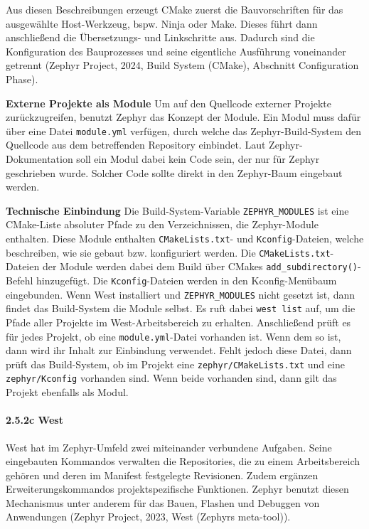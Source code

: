 Aus diesen Beschreibungen erzeugt CMake zuerst die Bauvorschriften f{\"u}r das ausgew{\"a}hlte Host-Werkzeug, bspw. Ninja oder Make. Dieses f{\"u}hrt dann anschlie{\ss}end die {\"U}bersetzungs- und Linkschritte aus. Dadurch sind die Konfiguration des Bauprozesses und seine eigentliche Ausf{\"u}hrung voneinander getrennt (Zephyr Project, 2024, \glqq{}Build System (CMake)\grqq{}, Abschnitt \glqq{}Configuration Phase\grqq{}).

\textbf{Externe Projekte als Module} Um auf den Quellcode externer Projekte zur{\"u}ckzugreifen, benutzt Zephyr das Konzept der \glqq{}Module\grqq{}. Ein Modul muss daf{\"u}r {\"u}ber eine Datei \lstinline[style=fileinline]|module.yml| verf{\"u}gen, durch welche das Zephyr-Build-System den Quellcode aus dem betreffenden Repository einbindet. Laut Zephyr-Dokumentation soll ein Modul dabei kein Code sein, der nur f{\"u}r Zephyr geschrieben wurde. Solcher Code sollte direkt in den Zephyr-Baum eingebaut werden.

\textbf{Technische Einbindung} Die Build-System-Variable \lstinline[style=fileinline]|ZEPHYR_MODULES| ist eine CMake-Liste absoluter Pfade zu den Verzeichnissen, die Zephyr-Module enthalten. Diese Module enthalten \lstinline[style=fileinline]|CMakeLists.txt|- und \lstinline[style=fileinline]|Kconfig|-Dateien, welche beschreiben, wie sie gebaut bzw. konfiguriert werden. Die \lstinline[style=fileinline]|CMakeLists.txt|-Dateien der Module werden dabei dem Build {\"u}ber CMakes \lstinline[style=fileinline]|add_subdirectory()|-Befehl hinzugef{\"u}gt. Die \lstinline[style=fileinline]|Kconfig|-Dateien werden in den Kconfig-Men{\"u}baum eingebunden. Wenn West installiert und \lstinline[style=fileinline]|ZEPHYR_MODULES| nicht gesetzt ist, dann findet das Build-System die Module selbst. Es ruft dabei \lstinline[style=fileinline]|west list| auf, um die Pfade aller Projekte im West-Arbeitsbereich zu erhalten. Anschlie{\ss}end pr{\"u}ft es f{\"u}r jedes Projekt, ob eine \lstinline[style=fileinline]|module.yml|-Datei vorhanden ist. Wenn dem so ist, dann wird ihr Inhalt zur Einbindung verwendet. Fehlt jedoch diese Datei, dann pr{\"u}ft das Build-System, ob im Projekt eine \lstinline[style=fileinline]|zephyr/CMakeLists.txt| und eine \lstinline[style=fileinline]|zephyr/Kconfig| vorhanden sind. Wenn beide vorhanden sind, dann gilt das Projekt ebenfalls als Modul.

\paragraph*{\textbf{2.5.2c West}}
West hat im Zephyr-Umfeld zwei miteinander verbundene Aufgaben. Seine eingebauten Kommandos verwalten die Repositories, die zu einem Arbeitsbereich geh{\"o}ren und deren im Manifest festgelegte Revisionen. Zudem erg{\"a}nzen Erweiterungskommandos projektspezifische Funktionen. Zephyr benutzt diesen Mechanismus unter anderem f{\"u}r das Bauen, Flashen und Debuggen von Anwendungen (Zephyr Project, 2023, \glqq{}West (Zephyr\grq{}s meta-tool)\grqq{}).

